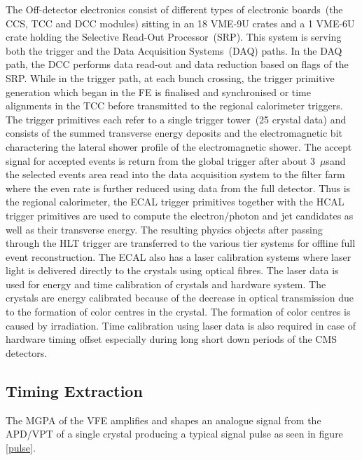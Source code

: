 The Off-detector electronics consist of different types of electronic boards~(the CCS, TCC and DCC modules) sitting in an 18 VME-9U crates and a 1 VME-6U crate holding the Selective Read-Out Processor~(SRP). This system is serving both the trigger and the  Data Acquisition Systems~(DAQ) paths. In the DAQ path, the DCC performs data read-out and data reduction based on flags of the SRP. While in the trigger path, at each bunch crossing, the trigger primitive generation which began in the FE is finalised and synchronised or time alignments in the TCC before transmitted to the regional calorimeter triggers. The trigger primitives each refer to a single trigger tower~(25 crystal data) and consists of  the summed transverse energy deposits and the electromagnetic bit charactering the lateral shower profile of the electromagnetic shower. The accept signal for accepted events is return from the global trigger after about 3~$\mu$sand the selected events area read into the data acquisition system to the filter farm where the even rate is further reduced using data from the full detector. Thus is the regional calorimeter, the ECAL trigger primitives  together with the HCAL trigger primitives are used to  compute the electron/photon and jet candidates as well as their transverse energy. The resulting physics objects after passing through the HLT trigger are transferred to the various tier systems for offline full event reconstruction. The ECAL also has a laser calibration systems where laser light is delivered directly to the \pb crystals using optical fibres. The laser data is used for energy and time calibration of crystals and hardware system. The crystals are energy calibrated because of the decrease in optical transmission due to the formation of color centres in the crystal. The formation of color centres is caused by irradiation. Time calibration using laser data is also required in case of hardware timing offset especially during long short down periods of the CMS detectors.
\subsection{Timing Extraction}
The MGPA of the VFE amplifies and shapes an analogue signal from the APD/VPT of a single crystal producing a typical signal pulse as seen in figure \eqref{pulse}. 

